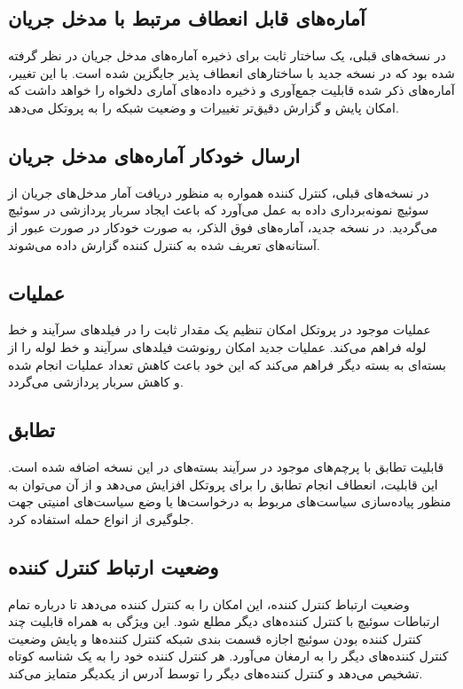 \subsection{آماره‌های قابل انعطاف مرتبط با مدخل جریان }
در نسخه‌های قبلی، یک ساختار ثابت برای ذخیره آماره‌های مدخل جریان در نظر گرفته شده بود که در نسخه جدید با ساختار‌های انعطاف پذیر جایگزین شده است. با این تغییر، آماره‌های ذکر شده قابلیت جمع‌آوری و ذخیره داده‌های آماری دلخواه را خواهد داشت که امکان پایش و گزارش دقیق‌تر تغییرات و وضعیت شبکه را به پروتکل می‌دهد.

\subsection{ارسال خودکار آماره‌های مدخل جریان}
در نسخه‌های قبلی، کنترل کننده همواره به منظور دریافت آمار مدخل‌های جریان از سوئیچ نمونه‌برداری داده به عمل می‌آورد که باعث ایجاد سربار پردازشی در سوئیچ می‌گردید. در نسخه جدید، آماره‌های فوق الذکر، به صورت خودکار در صورت عبور از آستانه‌های تعریف شده به کنترل کننده گزارش داده می‌شوند.

\subsection{عملیات }
عملیات  موجود در پروتکل امکان تنظیم یک مقدار ثابت را در فیلد‌های سرآیند و خط لوله فراهم می‌کند. عملیات جدید  امکان رونوشت فیلد‌های سرآیند و خط لوله را از بسته‌ای به بسته دیگر فراهم می‌کند که این خود باعث کاهش تعداد عملیات انجام شده و کاهش سربار پردازشی می‌گردد.

\subsection{تطابق }
قابلیت تطابق با پرچم‌های موجود در سرآیند بسته‌های  در این نسخه اضافه شده است. این قابلیت، انعطاف انجام تطابق را برای پروتکل افزایش می‌دهد و از آن می‌توان به منظور پیاده‌سازی سیاست‌های مربوط به درخواست‌ها یا وضع سیاست‌های امنیتی جهت جلوگیری از انواع حمله استفاده کرد.

\subsection{وضعیت ارتباط کنترل کننده}
وضعیت ارتباط کنترل کننده، این امکان را به کنترل کننده می‌دهد تا درباره تمام ارتباطات سوئیچ با کنترل کننده‌های دیگر مطلع شود. این ویژگی به همراه قابلیت چند کنترل کننده بودن سوئیچ اجازه قسمت بندی شبکه کنترل کننده‌ها و پایش وضعیت کنترل کننده‌های دیگر را به ارمغان می‌آورد. هر کنترل کننده خود را به یک شناسه کوتاه تشخیص می‌دهد و کنترل کننده‌های دیگر را توسط آدرس  از یکدیگر متمایز می‌کند.
\pagebreak

